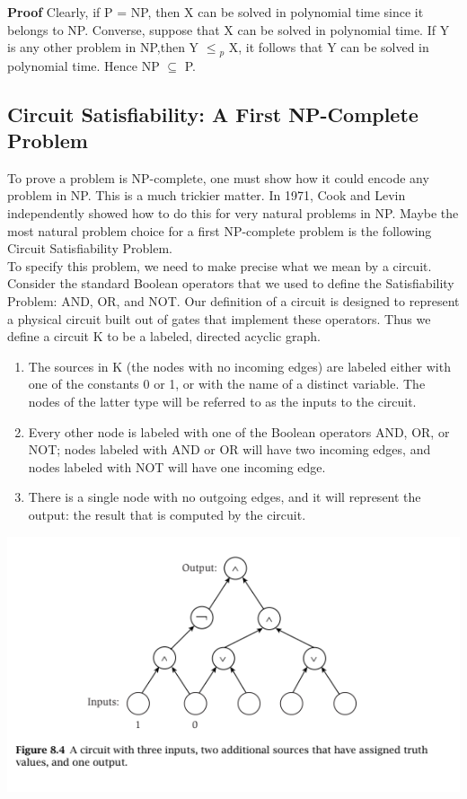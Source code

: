 \documentclass{article}
\begin{document}
\textbf{Proof} Clearly, if P = NP, then X can be solved in polynomial time since it belongs to NP. Converse, suppose that X can be solved in polynomial time. If Y is any other problem in NP,then Y $\le$$_p$ X, it follows that Y can be solved in polynomial time. Hence NP $\subseteq$ P.\\

\subsection{Circuit Satisfiability: A First NP-Complete Problem}
To prove a problem is NP-complete, one must show how it could encode any problem in NP. This is a much trickier matter. In 1971, Cook and Levin independently showed how to do this for very natural problems in NP. Maybe the most natural problem choice for a first NP-complete problem is the following Circuit Satisfiability Problem.\\

To specify this problem, we need to make precise what we mean by a circuit. Consider the standard Boolean operators that we used to define the Satisfiability Problem: AND, OR, and NOT. Our definition of a circuit is designed to represent a physical circuit built out of gates that implement these operators. Thus we define a circuit K to be a labeled, directed acyclic graph.\\

\begin{enumerate}
    \item The sources in K (the nodes with no incoming edges) are labeled either with one of the constants 0 or 1, or with the name of a distinct variable. The nodes of the latter type will be referred to as the inputs to the circuit.
    \item Every other node is labeled with one of the Boolean operators AND, OR, or NOT; nodes labeled with AND or OR will have two incoming edges, and nodes labeled with NOT will have one incoming edge.
    \item There is a single node with no outgoing edges, and it will represent the output: the result that is computed by the circuit.
\end{enumerate}

\begin{center}
    \includegraphics[]{figures/fig27.png}
\end{center}
\end{document}
